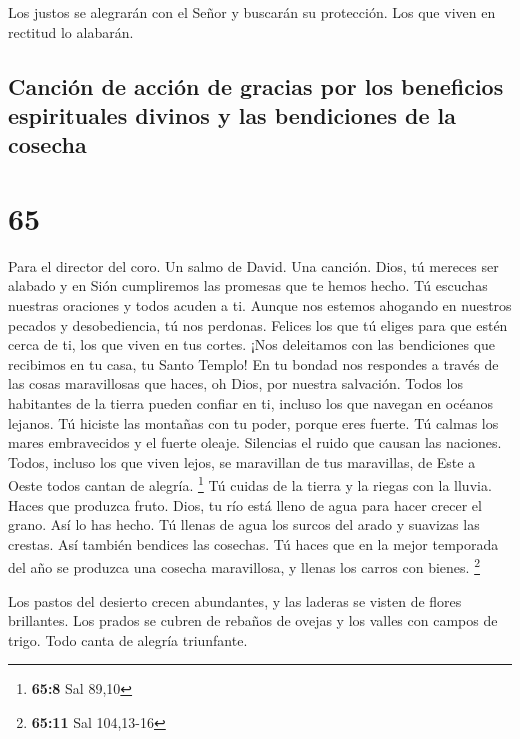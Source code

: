  Los justos se alegrarán con el Señor y buscarán su
protección. Los que viven en rectitud lo alabarán.

\hypertarget{canciuxf3n-de-acciuxf3n-de-gracias-por-los-beneficios-espirituales-divinos-y-las-bendiciones-de-la-cosecha}{%
\subsection{Canción de acción de gracias por los beneficios espirituales
divinos y las bendiciones de la
cosecha}\label{canciuxf3n-de-acciuxf3n-de-gracias-por-los-beneficios-espirituales-divinos-y-las-bendiciones-de-la-cosecha}}

\hypertarget{section-64}{%
\section{65}\label{section-64}}

Para el director del coro. Un salmo de David. Una canción. 
Dios, tú mereces ser alabado y en Sión cumpliremos las promesas que te
hemos hecho.  Tú escuchas nuestras oraciones y todos acuden
a ti.  Aunque nos estemos ahogando en nuestros pecados y
desobediencia, tú nos perdonas.  Felices los que tú eliges
para que estén cerca de ti, los que viven en tus cortes. ¡Nos deleitamos
con las bendiciones que recibimos en tu casa, tu Santo Templo!
 En tu bondad nos respondes a través de las cosas
maravillosas que haces, oh Dios, por nuestra salvación. Todos los
habitantes de la tierra pueden confiar en ti, incluso los que navegan en
océanos lejanos.  Tú hiciste las montañas con tu poder,
porque eres fuerte.  Tú calmas los mares embravecidos y el
fuerte oleaje. Silencias el ruido que causan las naciones. 
Todos, incluso los que viven lejos, se maravillan de tus maravillas, de
Este a Oeste todos cantan de alegría. \footnote{\textbf{65:8} Sal 89,10}
 Tú cuidas de la tierra y la riegas con la lluvia. Haces que
produzca fruto. Dios, tu río está lleno de agua para hacer crecer el
grano. Así lo has hecho.  Tú llenas de agua los surcos del
arado y suavizas las crestas. Así también bendices las cosechas.
 Tú haces que en la mejor temporada del año se produzca una
cosecha maravillosa, y llenas los carros con bienes. \footnote{\textbf{65:11}
  Sal 104,13-16}

 Los pastos del desierto crecen abundantes, y las laderas
se visten de flores brillantes.  Los prados se cubren de
rebaños de ovejas y los valles con campos de trigo. Todo canta de
alegría triunfante.

